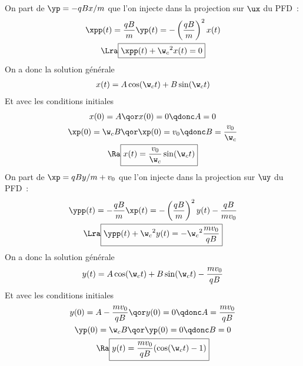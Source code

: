 \documentclass[../main/main.tex]{subfiles}
\begin{document}
\begin{itemize}[label=$\diamond$]
     On part de $\yp = -qBx/m$ que l'on injecte dans la
        projection sur $\ux$ du PFD~:
        \begin{gather*}
            \xpp(t) = \frac{qB}{m}\yp(t) = - \left( \frac{qB}{m} \right)^2x(t)
            \\\Lra
            \boxed{\xpp(t) + \w_c{}^2x(t) = 0}
        \end{gather*}
        On a donc la solution générale
        \begin{gather*}
            x(t) = A\cos(\w_ct) + B\sin(\w_ct)
        \end{gather*}
        Et avec les conditions initiales
        \begin{gather*}
            x(0) = A
            \qor
            x(0) = 0
            \qdonc
            A = 0
            \\
            \xp(0) = \w_cB
            \qor
            \xp(0) = v_0
            \qdonc
            B = \frac{v_0}{\w_c}
            \\\Ra
            \boxed{x(t) = \frac{v_0}{\w_c}\sin(\w_ct)}
        \end{gather*}
     On part de $\xp = qBy/m + v_0$ que l'on injecte dans la
        projection sur $\uy$ du PFD~:
        \begin{gather*}
            \ypp(t) = -\frac{qB}{m}\xp(t) = - \left( \frac{qB}{m} \right)^2y(t)
            - \frac{qB}{mv_0}
            \\\Lra
            \boxed{\ypp(t) + \w_c{}^2y(t) = -\w_c{}^2\frac{mv_0}{qB}}
        \end{gather*}
        On a donc la solution générale
        \begin{gather*}
            y(t) = A\cos(\w_ct) + B\sin(\w_ct) - \frac{mv_0}{qB}
        \end{gather*}
        Et avec les conditions initiales
        \begin{gather*}
            y(0) = A - \frac{mv_0}{qB}
            \qor
            y(0) = 0
            \qdonc
            A = \frac{mv_0}{qB}
            \\
            \yp(0) = \w_cB
            \qor
            \yp(0) = 0
            \qdonc
            B = 0
            \\\Ra
            \boxed{y(t) = \frac{mv_0}{qB}(\cos(\w_ct)-1)}
        \end{gather*}
\end{itemize}
\end{document}
